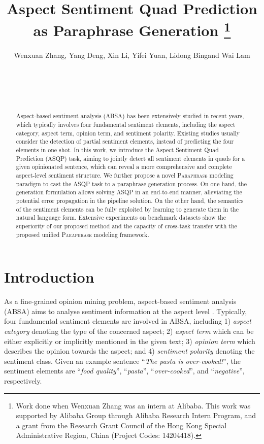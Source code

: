 \documentclass[11pt]{article}
\title{Aspect Sentiment Quad Prediction as Paraphrase Generation
\thanks{\hspace{1mm} Work done when Wenxuan Zhang was an intern at Alibaba. This work was supported by Alibaba Group through Alibaba Research Intern Program, and a grant from the Research Grant Council of the Hong Kong Special Administrative Region, China (Project Codes: 14204418).}
}
\author{
Wenxuan Zhang\affmark[1], Yang Deng\affmark[1], Xin Li\affmark[2], Yifei Yuan\affmark[1], Lidong Bing\affmark[2] and Wai Lam\affmark[1]\\
\affaddr{\affmark[1]The Chinese University of Hong Kong}\\
\affaddr{\affmark[2]DAMO Academy, Alibaba Group}\\
\email{\{wxzhang,ydeng,yfyuan,wlam\}@se.cuhk.edu.hk}\\
\email{\{xinting.lx,l.bing\}@alibaba-inc.com}\\
}
\begin{document}
\maketitle
\begin{abstract}
Aspect-based sentiment analysis (ABSA) has been extensively studied in recent years, which typically involves four fundamental sentiment elements, including the aspect category, aspect term, opinion term, and sentiment polarity. Existing studies usually consider the detection of partial sentiment elements, instead of predicting the four elements in one shot. In this work, we introduce the Aspect Sentiment Quad Prediction (ASQP) task, aiming to jointly detect all sentiment elements in quads for a given opinionated sentence, which can reveal a more comprehensive and complete aspect-level sentiment structure. We further propose a novel \textsc{Paraphrase} modeling paradigm to cast the ASQP task to a paraphrase generation process. On one hand, the generation formulation allows solving ASQP in an end-to-end manner, alleviating the potential error propagation in the pipeline solution. On the other hand, the semantics of the sentiment elements can be fully exploited by learning to generate them in the natural language form. Extensive experiments on benchmark datasets show the superiority of our proposed method and the capacity of cross-task transfer with the proposed unified \textsc{Paraphrase} modeling framework.
\end{abstract}


\section{Introduction}

As a fine-grained opinion mining problem, aspect-based sentiment analysis (ABSA) aims to analyse sentiment information at the aspect level \cite{liu-2012-absa, semeval14-absa}. Typically, four fundamental sentiment elements are involved in ABSA, including 1) \textit{aspect category} denoting the type of the concerned aspect; 2) \textit{aspect term} which can be either explicitly or implicitly mentioned in the given text; 3) \textit{opinion term} which describes the opinion towards the aspect; and 4) \textit{sentiment polarity} denoting the sentiment class. Given an example sentence ``\textit{The pasta is over-cooked!}'', the sentiment elements are ``\textit{food quality}'', ``\textit{pasta}'', ``\textit{over-cooked}'', and ``\textit{negative}'', respectively.
\end{document}
